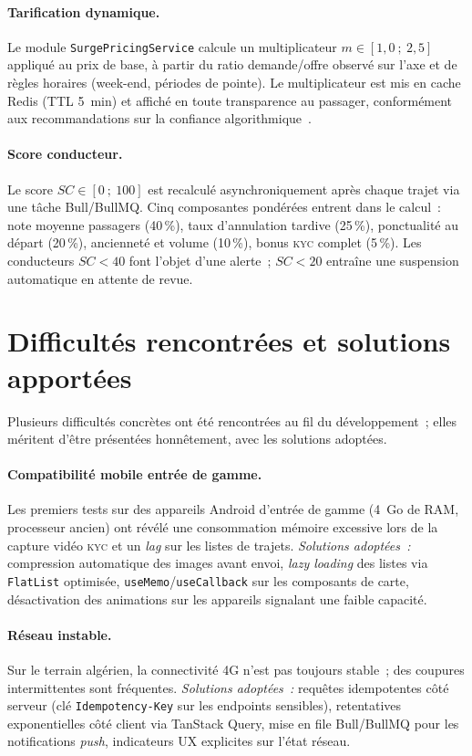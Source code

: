 \documentclass[12pt, a4paper, oneside]{report}
\begin{document}
\paragraph{Tarification dynamique.} Le module \texttt{SurgePricingService} calcule un multiplicateur $m \in [1{,}0~;~2{,}5]$ appliqué au prix de base, à partir du ratio demande/offre observé sur l'axe et de règles horaires (week-end, périodes de pointe). Le multiplicateur est mis en cache Redis (TTL 5~min) et affiché en toute transparence au passager, conformément aux recommandations sur la confiance algorithmique~\cite{si2023what}.

\paragraph{Score conducteur.} Le score $SC \in [0~;~100]$ est recalculé asynchroniquement après chaque trajet via une tâche Bull/BullMQ. Cinq composantes pondérées entrent dans le calcul~: note moyenne passagers (40\,\%), taux d'annulation tardive (25\,\%), ponctualité au départ (20\,\%), ancienneté et volume (10\,\%), bonus \textsc{kyc} complet (5\,\%). Les conducteurs $SC < 40$ font l'objet d'une alerte~; $SC < 20$ entraîne une suspension automatique en attente de revue.

\section{Difficultés rencontrées et solutions apportées}
\label{sec:difficultes}

Plusieurs difficultés concrètes ont été rencontrées au fil du développement~; elles méritent d'être présentées honnêtement, avec les solutions adoptées.

\paragraph{Compatibilité mobile entrée de gamme.} Les premiers tests sur des appareils Android d'entrée de gamme (4~Go de RAM, processeur ancien) ont révélé une consommation mémoire excessive lors de la capture vidéo \textsc{kyc} et un \textit{lag} sur les listes de trajets. \textit{Solutions adoptées~:} compression automatique des images avant envoi, \textit{lazy loading} des listes via \texttt{FlatList} optimisée, \texttt{useMemo}/\texttt{useCallback} sur les composants de carte, désactivation des animations sur les appareils signalant une faible capacité.

\paragraph{Réseau instable.} Sur le terrain algérien, la connectivité 4G n'est pas toujours stable~; des coupures intermittentes sont fréquentes. \textit{Solutions adoptées~:} requêtes idempotentes côté serveur (clé \texttt{Idempotency-Key} sur les endpoints sensibles), retentatives exponentielles côté client via TanStack Query, mise en file Bull/BullMQ pour les notifications \textit{push}, indicateurs UX explicites sur l'état réseau.
\end{document}
